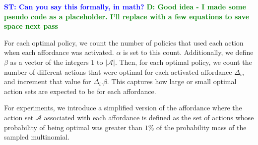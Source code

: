\documentclass[conference]{IEEEtran}
\newcommand{\stnote}[1]{\textcolor{Blue}{\textbf{ST: #1}}}
\newcommand{\dnote}[1]{\textcolor{Green}{\textbf{D: #1}}}
\begin{document}
\stnote{Can you say this formally, in math?}
\dnote{Good idea - I made some pseudo code as a placeholder. I'll replace with a few equations to save space next pass}

%
%
%


For each optimal policy, we count the number of policies that used
each action when each affordance was activated. $\alpha$ is set to
this count. Additionally, we define $\beta$ as a vector of the
integers $1$ to $|\mathcal{A}|$.  Then, for each optimal policy, we
count the number of different actions that were optimal for each
activated affordance $\Delta_i$, and increment that value for
$\Delta_i.\beta$. This captures how large or small optimal action sets
are expected to be for each affordance.

For experiments, we introduce a simplified version of the affordance where
the action set $\mathcal{A}$ associated with each affordance is defined
as the set of actions whose probability of being optimal was greater than $1\%$
of the probability mass of the sampled multinomial.
\end{document}
